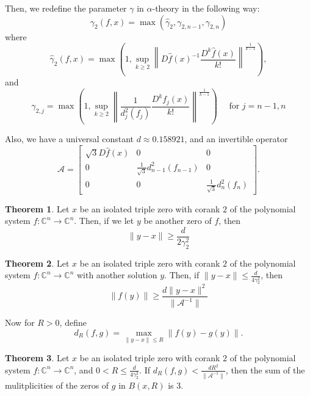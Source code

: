 \documentclass[12pt,oneside,reqno]{amsart}
\theoremstyle{definition}
\newtheorem{thm}{Theorem}
\begin{document}
Then, we redefine the parameter $\gamma$ in $\alpha$-theory in the following way:
$$\gamma_2(f,x)=\max(\hat{\gamma}_2,\gamma_{2,n-1},\gamma_{2,n})$$
where
\[\hat{\gamma}_2(f,x)=\max\left(1,\sup\limits_{k\geq 2}\left\|D\hat{f}(x)^{-1}\frac{D^k\hat{f}(x)}{k!}\right\|^{\frac{1}{k-1}}\right),\]
and
\[\gamma_{2,j}=\max\left(1,\sup\limits_{k\geq 2}\left\|\frac{1}{d_j^2(f_j)}\frac{D^k f_j(x)}{k!}\right\|^{\frac{1}{k-1}}\right)\quad \text{ for } j=n-1,n\]


Also, we have a universal constant $d\approx0.158921$, and an invertible operator 
\[\mathcal{A}=\begin{bmatrix}
\sqrt{3}D\hat{f}(x) & 0 & 0\\
0 & \frac{1}{\sqrt{3}}d_{n-1}^2(f_{n-1}) & 0 \\
0 & 0 & \frac{1}{\sqrt{3}}d_{n}^2(f_{n})
\end{bmatrix}.\]

\begin{thm}\label{thm:tripleRootSeparationBound}
	Let $x$ be an isolated triple zero with corank $2$ of the polynomial system $f:\mathbb{C}^n\rightarrow\mathbb{C}^n$. Then, if we let $y$ be another zero of $f$, then
	\[\|y-x\|\geq \frac{d}{2\gamma_2^2}\]
\end{thm}

\begin{thm}\label{thm:lowerboundfy}
	Let $x$ be an isolated triple zero with corank $2$ of the polynomial system $f:\mathbb{C}^n\rightarrow \mathbb{C}^n$ with another solution $y$. Then, if $\|y-x\|\leq \frac{d}{4\gamma_2^2}$, then
	\[\left\|f(y)\right\|\geq \frac{d\|y-x\|^2}{\|\mathcal{A}^{-1}\|}\]
\end{thm}


Now for $R>0$, define
\begin{equation*}
d_R(f,g)=\max\limits_{\|y-x\|\leq R}\|f(y)-g(y)\|.
\end{equation*}
\begin{thm}\label{thm:multiplicityOfDiffSystem}
	Let $x$ be an isolated triple zero with corank $2$ of the polynomial system $f:\mathbb{C}^n\rightarrow\mathbb{C}^n$, and $0<R\leq \frac{d}{4\gamma_2^2}$. If $d_R(f,g)<\frac{dR^2}{\|\mathcal{A}^{-1}\|}$, then the sum of the mulitplicities of the zeros of $g$ in $B(x,R)$ is $3$.
\end{thm}
\end{document}
